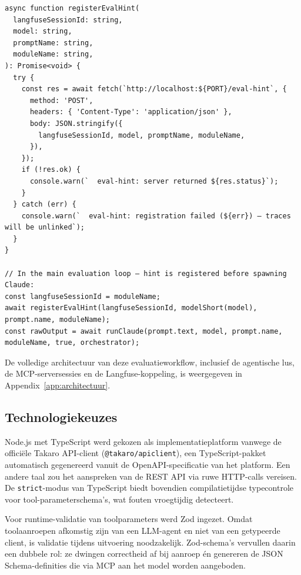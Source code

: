 \begin{listing}[h!]
\begin{verbatim}
async function registerEvalHint(
  langfuseSessionId: string,
  model: string,
  promptName: string,
  moduleName: string,
): Promise<void> {
  try {
    const res = await fetch(`http://localhost:${PORT}/eval-hint`, {
      method: 'POST',
      headers: { 'Content-Type': 'application/json' },
      body: JSON.stringify({
        langfuseSessionId, model, promptName, moduleName,
      }),
    });
    if (!res.ok) {
      console.warn(`  eval-hint: server returned ${res.status}`);
    }
  } catch (err) {
    console.warn(`  eval-hint: registration failed (${err}) — traces will be unlinked`);
  }
}

// In the main evaluation loop — hint is registered before spawning Claude:
const langfuseSessionId = moduleName;
await registerEvalHint(langfuseSessionId, modelShort(model), prompt.name, moduleName);
const rawOutput = await runClaude(prompt.text, model, prompt.name, moduleName, true, orchestrator);
\end{verbatim}
\caption[Registratie van de eval-hint vóór het starten van Claude]{Registratie van de \texttt{langfuseSessionId} bij de MCP-server vóór het starten van de Claude Code-instantie, uit \texttt{eval-runner.ts}.}
\label{lst:eval-hint}
\end{listing}

De volledige architectuur van deze evaluatieworkflow, inclusief de agentische lus, de MCP-serversessies en de Langfuse-koppeling, is weergegeven in Appendix~\ref{app:architectuur}.

\subsection{Technologiekeuzes}\label{subsec:technologie}

Node.js met TypeScript werd gekozen als implementatieplatform vanwege de officiële Takaro API-client (\texttt{@takaro/apiclient}), een TypeScript-pakket automatisch gegenereerd vanuit de OpenAPI-specificatie van het platform. Een andere taal zou het aanspreken van de REST API via ruwe HTTP-calls vereisen. De \texttt{strict}-modus van TypeScript biedt bovendien compilatietijdse typecontrole voor tool-parameterschema’s, wat fouten vroegtijdig detecteert.

Voor runtime-validatie van toolparameters werd Zod ingezet. Omdat toolaanroepen afkomstig zijn van een LLM-agent en niet van een getypeerde client, is validatie tijdens uitvoering noodzakelijk. Zod-schema’s vervullen daarin een dubbele rol: ze dwingen correctheid af bij aanroep én genereren de JSON Schema-definities die via MCP aan het model worden aangeboden.

